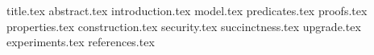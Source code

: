 \documentclass[11pt]{llncs}
\begin{document}
{title.tex}
\thispagestyle{plain}
{abstract.tex}
{introduction.tex}
{model.tex}
{predicates.tex}
{proofs.tex}
{properties.tex}
{construction.tex}
{security.tex}
{succinctness.tex}
{upgrade.tex}
{experiments.tex}
{references.tex}
\end{document}
